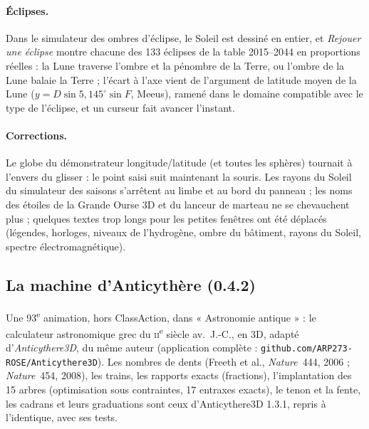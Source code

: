 \paragraph{Éclipses.} Dans le simulateur des ombres d'éclipse, le Soleil est dessiné en entier, et \emph{Rejouer une
éclipse} montre chacune des 133 éclipses de la table 2015–2044 en proportions réelles : la Lune traverse l'ombre et la
pénombre de la Terre, ou l'ombre de la Lune balaie la Terre ; l'écart à l'axe vient de l'argument de latitude moyen de
la Lune ($y = D \sin 5{,}145^\circ \sin F$, Meeus), ramené dans le domaine compatible avec le type de l'éclipse, et un
curseur fait avancer l'instant.

\paragraph{Corrections.} Le globe du démonstrateur longitude/latitude (et toutes les sphères) tournait à l'envers du
glisser : le point saisi suit maintenant la souris. Les rayons du Soleil du simulateur des saisons s'arrêtent au limbe
et au bord du panneau ; les noms des étoiles de la Grande Ourse 3D et du lanceur de marteau ne se chevauchent plus ;
quelques textes trop longs pour les petites fenêtres ont été déplacés (légendes, horloges, niveaux de l'hydrogène,
ombre du bâtiment, rayons du Soleil, spectre électromagnétique).


\subsection{La machine d'Anticythère (0.4.2)}\label{sec:anticythere}
Une 93\textsuperscript{e} animation, hors ClassAction, dans « Astronomie antique » : le calculateur astronomique grec
du \textsc{ii}\textsuperscript{e} siècle av.~J.-C., en 3D, adapté d'\emph{Anticythere3D}, du même auteur (application
complète : \texttt{github.com/ARP273-ROSE/Anticythere3D}). Les nombres de dents (Freeth et al., \emph{Nature}~444,
2006 ; \emph{Nature}~454, 2008), les trains, les rapports exacts (fractions), l'implantation des 15 arbres
(optimisation sous contraintes, 17 entraxes exacts), le tenon et la fente, les cadrans et leurs graduations sont ceux
d'Anticythere3D 1.3.1, repris à l'identique, avec ses tests.

